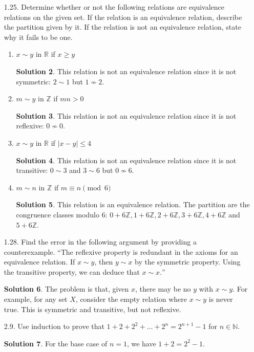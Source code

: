 \documentclass{article}
\newcommand{\RR}{\mathbb{R}}
\newcommand{\NN}{\mathbb{N}}
\newcommand{\ZZ}{\mathbb{Z}}
\theoremstyle{definition}
\newtheorem*{solution}{Solution}
\begin{document}
\begin{enumerate}
\begin{enumerate}
\begin{solution}
One can argue as in part (d), or as follows.  Suppose $b \in B$.  Since $g \circ f$ is onto, there is an $a \in A$ with $g(f(a)) = g(b)$.  Since $g$ is one-to-one, $f(a) = b$.  Thus $f$ is onto. \qed
\end{solution}
\end{enumerate}
\item[1.25.] Determine whether or not the following relations are equivalence relations on the given set.  If the relation is an equivalence relation, describe the partition given by it.  If the relation is not an equivalence relation, state why it fails to be one.
\begin{enumerate}
\item $x \sim y$ in $\RR$ if $x \ge y$
\begin{solution}
This relation is not an equivalence relation since it is not symmetric: $2 \sim 1$ but $1 \not\sim 2$.
\end{solution}
\item $m \sim y$ in $\ZZ$ if $mn > 0$
\begin{solution}
This relation is not an equivalence relation since it is not reflexive: $0 \not\sim 0$.
\end{solution}
\item $x \sim y$ in $\RR$ if $\lvert x - y \rvert \le 4$
\begin{solution}
This relation is not an equivalence relation since it is not transitive: $0 \sim 3$ and $3 \sim 6$ but $0 \not\sim 6$.
\end{solution}
\item $m \sim n$ in $\ZZ$ if $m \equiv n \pmod{6}$
\begin{solution}
This relation is an equivalence relation.  The partition are the congruence classes modulo $6$: $0 + 6\ZZ, 1 + 6\ZZ, 2 + 6\ZZ, 3 + 6\ZZ, 4 + 6\ZZ$ and $5 + 6\ZZ$.
\end{solution}
\end{enumerate}
\item[1.28.] Find the error in the following argument by providing a counterexample.  ``The reflexive property is redundant in the axioms for an equivalence relation.  If $x \sim y$, then $y \sim x$ by the symmetric property.  Using the transitive property, we can deduce that $x \sim x.$''
\begin{solution}
The problem is that, given $x$, there may be no $y$ with $x \sim y$.  For example, for any set $X$, consider the empty relation where $x \sim y$ is never true.  This is symmetric and transitive, but not reflexive.
\end{solution}
\item[2.9.] Use induction to prove that $1 + 2 + 2^2 + \dots + 2^n = 2^{n+1} - 1$ for $n \in \NN$.
\begin{solution}
For the base case of $n=1$, we have $1 + 2 = 2^2 - 1$.


\end{solution}
\end{enumerate}
\end{document}
